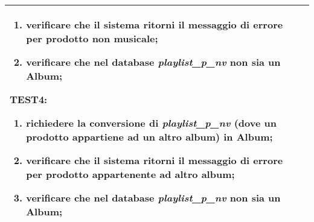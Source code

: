 \begin{table}[hb]
\begin{tabular}{ |p{2cm}|p{10cm}|  }
\begin{enumerate}[nosep, topsep=0pt]
            \item verificare che il sistema ritorni il messaggio di errore per prodotto non musicale;
            \item verificare che nel database \emph{playlist\_p\_nv} non sia un Album;
        \end{enumerate}
        \vspace{0.5cm} TEST4:
        \begin{enumerate}[nosep, topsep=0pt]
            \item richiedere la conversione di \emph{playlist\_p\_nv} (dove un prodotto appartiene ad un altro album) in Album;
            \item verificare che il sistema ritorni il messaggio di errore per prodotto appartenente ad altro album;
            \item verificare che nel database \emph{playlist\_p\_nv} non sia un Album;
        \end{enumerate}
        \\\hline
    \end{tabular}
\end{table}

